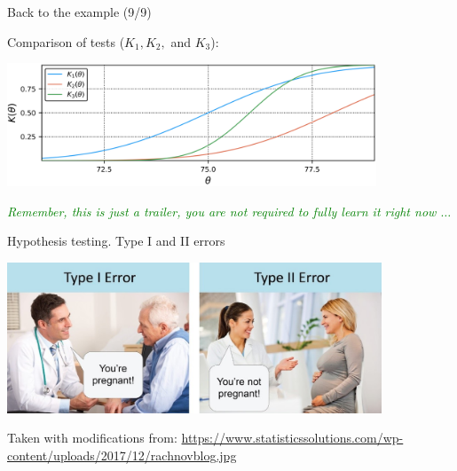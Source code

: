 \documentclass{beamer}
\begin{document}
\begin{frame}
{\centerline{Back to the example (9/9)}}

Comparison of tests ($K_1, K_2,$ and $K_3$):
  
\begin{center}  
\includegraphics[width=11cm]{A2022.IDSEPC.SperimentazioneDeduzione/kk.png}

\end{center}

\vspace*{0.5cm}
\begin{center}
\textcolor{green}{\textit{Remember, this is just a trailer, you are not required to fully learn it right now $\ldots{}$}}
\end{center}

\end{frame}



\begin{frame}
{\centerline{Hypothesis testing. Type I and II errors}}

\begin{center}
\includegraphics[height=4.5cm]{A2022.IDSEPC.SperimentazioneDeduzione/t1-t2-examples.jpg}
\end{center}

\vspace*{0.5cm}
\begin{center}
\tiny
Taken with modifications from: \url{https://www.statisticssolutions.com/wp-content/uploads/2017/12/rachnovblog.jpg}
\end{center}

\end{frame}
\end{document}
